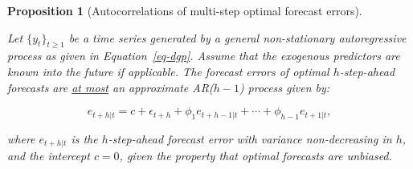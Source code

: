 \documentclass[
  11pt,
  a4paper,
]{article}
\theoremstyle{plain}
\newtheorem{proposition}{Proposition}[section]
\theoremstyle{plain}
\theoremstyle{remark}
\begin{document}
\begin{proposition}[Autocorrelations of multi-step optimal forecast
errors]\protect\hypertarget{prp-ar}{}\label{prp-ar}

Let \(\{y_t\}_{t \geq 1}\) be a time series generated by a general
non-stationary autoregressive process as given in Equation~\ref{eq-dgp}.
Assume that the exogenous predictors are known into the future if
applicable. The forecast errors of optimal \(h\)-step-ahead forecasts
are \ul{at most} an approximate AR(\(h-1\)) process given by:

\[
e_{t+h|t} = c + \epsilon_{t+h} + \phi_1e_{t+h-1|t} + \cdots + \phi_{h-1}e_{t+1|t},
\]

where \(e_{t+h|t}\) is the \(h\)-step-ahead forecast error with variance
non-decreasing in \(h\), and the intercept \(c=0\), given the property
that optimal forecasts are unbiased.

\end{proposition}
\end{document}
